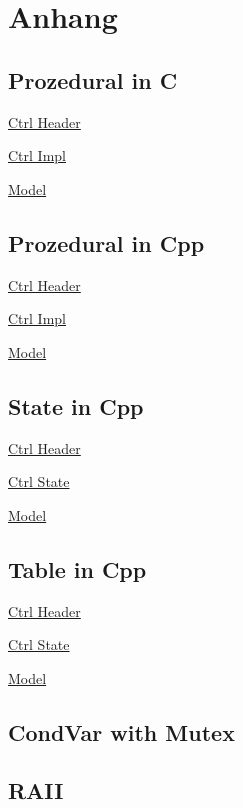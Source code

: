 \newpage
\onecolumn
\section{Anhang}
\subsection{Prozedural in C}
\underline{Ctrl Header}


\noindent\underline{Ctrl Impl}

\noindent\underline{Model}


\subsection{Prozedural in Cpp}
\underline{Ctrl Header}

\noindent\underline{Ctrl Impl}


\underline{Model}


\subsection{State in Cpp}
\underline{Ctrl Header}

\noindent\underline{Ctrl State}

\noindent\underline{Model}


\subsection{Table in Cpp}
\underline{Ctrl Header}

\noindent\underline{Ctrl State}

\noindent\underline{Model}


\subsection{CondVar with Mutex}


\subsection{RAII}

